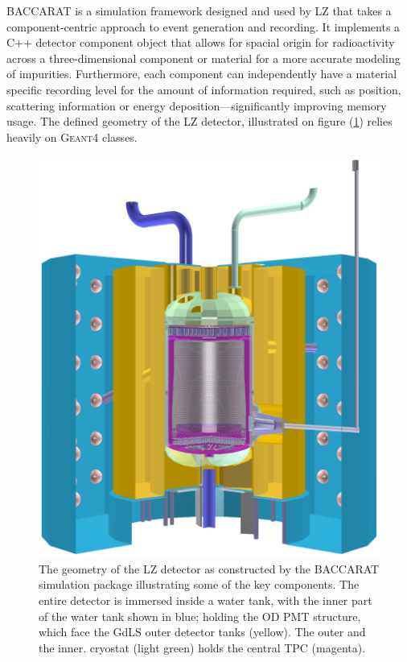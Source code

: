 \textsc{BACCARAT} is a simulation framework designed and used by LZ that takes a component-centric approach to event generation and recording. It implements a C++ detector component object that allows for spacial origin for radioactivity across a three-dimensional component or material for a more accurate modeling of impurities. Furthermore, each component can independently have a material specific recording level for the amount of information required, such as position, scattering information or energy deposition---significantly improving memory usage. The defined geometry of the LZ detector, illustrated on figure (\ref{fig:lz_geometry_viz}) relies heavily on \textsc{Geant4} classes.

%
\begin{figure}[b]
    \centering
    \includegraphics[scale=0.21]{Chapter_5/Figures/lz_geometry_viz.png}
    \caption
    {The geometry of the LZ detector as constructed by the \textsc{BACCARAT} simulation package illustrating some of the key components. The entire detector is immersed inside a water tank, with the inner part of the water tank shown in blue; holding the OD PMT structure, which face the GdLS outer detector tanks (yellow). The outer and the inner. cryostat (light green) holds the central TPC (magenta).}
    \label{fig:lz_geometry_viz}
\end{figure}
%

